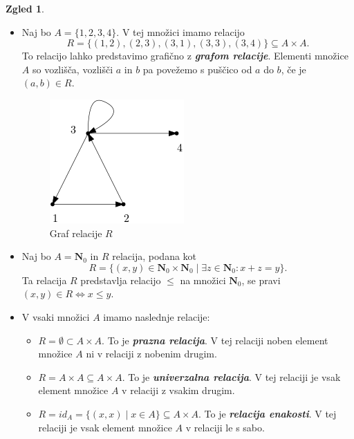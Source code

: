 \documentclass[11pt]{book}
\def\NN{\mathbf{N}}
\def\definicija{\color{rdeca}\bf\em}
\theoremstyle{definition}
\theoremstyle{zgled}
\newtheorem*{zgled}{Zgled}
\theoremstyle{odprtproblem}
\theoremstyle{domacanaloga}
\theoremstyle{izrek}
\begin{document}
\begin{zgled} \leavevmode
    \begin{itemize}
        \item Naj bo $A = \{ 1,2,3,4 \}$. V tej množici imamo relacijo
        \[
            R = \{ (1,2), (2,3), (3,1), (3,3), (3,4) \} \subseteq A \times A.
        \]
        To relacijo lahko predstavimo grafično z {\definicija grafom relacije}. Elementi množice $A$ so vozlišča, vozlišči $a$ in $b$ pa povežemo s puščico od $a$ do $b$, če je $(a,b) \in R$.

        \begin{figure}[h]
            \centering
            \includegraphics[width=0.3\linewidth]{img/relacije-graf.png}
            \caption{Graf relacije $R$}
        \end{figure}

        \item Naj bo $A = \NN_0$ in $R$ relacija, podana kot
        \[
            R = \{ (x,y) \in \NN_0 \times \NN_0 \mid \exists z \in \NN_0 \colon x + z = y \}.
        \]
        Ta relacija $R$ predstavlja relacijo $\leq$ na množici $\NN_0$, se pravi $(x,y) \in R \Leftrightarrow x \leq y$.

        \item V vsaki množici $A$ imamo naslednje relacije:
        \begin{itemize}
            \item $R = \emptyset \subset A \times A$. To je {\definicija prazna relacija}. V tej relaciji noben element množice $A$ ni v relaciji z nobenim drugim.
            \item $R = A \times A \subseteq A \times A$. To je {\definicija univerzalna relacija}. V tej relaciji je vsak element množice $A$ v relaciji z vsakim drugim.
            \item $R = id_A = \{ (x,x) \mid x \in A \} \subseteq A \times A$. To je {\definicija relacija enakosti}. V tej relaciji je vsak element množice $A$ v relaciji le s sabo.
        \end{itemize}
    \end{itemize}
\end{zgled}
\end{document}
